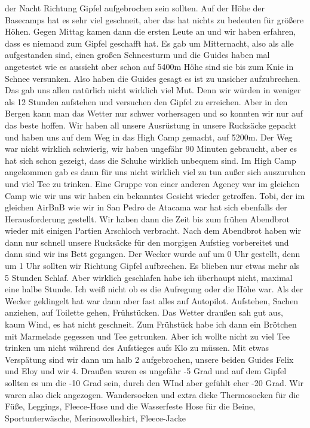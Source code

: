 \documentclass[11pt]{book}
\begin{document}
der Nacht Richtung Gipfel aufgebrochen sein sollten. Auf der Höhe der Basecamps hat es sehr viel geschneit, aber das hat nichts zu bedeuten für größere 
Höhen. Gegen Mittag kamen dann die ersten Leute an und wir haben erfahren, dass es niemand zum Gipfel geschafft hat. Es gab um Mitternacht, also als 
alle aufgestanden sind, einen großen Schneesturm und die Guides haben mal angetestet wie es aussieht aber schon auf 5400m Höhe sind sie bis zum Knie 
in Schnee versunken. Also haben die Guides gesagt es ist zu unsicher aufzubrechen. Das gab uns allen natürlich nicht wirklich viel Mut. Denn wir würden 
in weniger als 12 Stunden aufstehen und versuchen den Gipfel zu erreichen. Aber in den Bergen kann man das Wetter nur schwer vorhersagen und so konnten 
wir nur auf das beste hoffen. Wir haben all unsere Ausrüstung in unsere Rucksäcke gepackt und haben uns auf dem Weg in das High Camp gemacht, auf 5200m. 
Der Weg war nicht wirklich schwierig, wir haben ungefähr 90 Minuten gebraucht, aber es hat sich schon gezeigt, dass die Schuhe wirklich unbequem sind. 
Im High Camp angekommen gab es dann für uns nicht wirklich viel zu tun außer sich auszuruhen und viel Tee zu trinken. Eine Gruppe von einer anderen 
Agency war im gleichen Camp wie wir uns wir haben ein bekanntes Gesicht wieder getroffen. Tobi, der im gleichen AirBnB wie wir in San Pedro de Atacama 
war hat sich ebenfalls der Herausforderung gestellt. Wir haben dann die Zeit bis zum frühen Abendbrot wieder mit einigen Partien Arschloch verbracht. Nach dem
Abendbrot haben wir dann nur schnell unsere Rucksäcke für den morgigen Aufstieg vorbereitet und dann sind wir ins Bett gegangen. Der Wecker wurde auf um 
0 Uhr gestellt, denn um 1 Uhr sollten wir Richtung Gipfel aufbrechen. Es blieben nur etwas mehr als 5 Stunden Schlaf. Aber wirklich geschlafen habe ich 
überhaupt nicht, maximal eine halbe Stunde. Ich weiß nicht ob es die Aufregung oder die Höhe war. Als der Wecker geklingelt hat war dann aber fast alles 
auf Autopilot. Aufstehen, Sachen anziehen, auf Toilette gehen, Frühstücken. Das Wetter draußen sah gut aus, kaum Wind, es hat nicht geschneit. Zum 
Frühstück habe ich dann ein Brötchen mit Marmelade gegessen und Tee getrunken. Aber ich wollte nicht zu viel Tee trinken um nicht während des Aufstieges 
aufs Klo zu müssen. Mit etwas Verspätung sind wir dann um halb 2 aufgebrochen, unsere beiden Guides Felix und Eloy und wir 4. Draußen waren es ungefähr 
-5 Grad und auf dem Gipfel sollten es um die -10 Grad sein, durch den WInd aber gefühlt eher -20 Grad. Wir waren also dick angezogen. Wandersocken und 
extra dicke Thermosocken für die Füße, Leggings, Fleece-Hose und die Wasserfeste Hose für die Beine, Sportunterwäsche, Merinowolleshirt, Fleece-Jacke 
\end{document}

